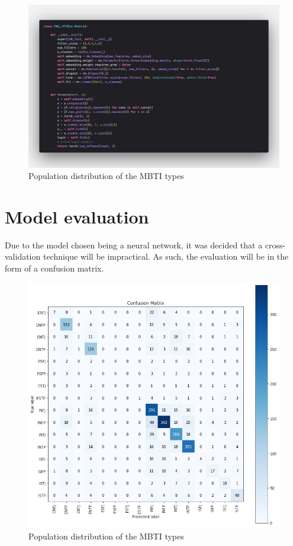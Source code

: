 \documentclass[11pt,a4paper]{article}
\begin{document}
	\begin{figure}[h!]
		\centering
		
		\includegraphics[width=\textwidth]{../output/visualisations/code}
		
		\caption{Population distribution of the MBTI types}
		
	\end{figure}
	
	\section{Model evaluation}
	
	Due to the model chosen being a neural network, it was decided that a cross-validation technique will be impractical. As such, the evaluation will be in the form of a confusion matrix.
	
	\begin{figure}[h!]
		\centering
		
		\includegraphics[width=\textwidth]{../output/visualisations/confusion}
		
		\caption{Population distribution of the MBTI types}
		
	\end{figure}
	
\end{document}
